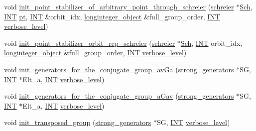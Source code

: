 \begin{DoxyCompactItemize}
void \mbox{\hyperlink{classstrong__generators_a51fbf5e2eeb7ad0c700315ccb4001781}{init\+\_\+point\+\_\+stabilizer\+\_\+of\+\_\+arbitrary\+\_\+point\+\_\+through\+\_\+schreier}} (\mbox{\hyperlink{classschreier}{schreier}} $\ast$\mbox{\hyperlink{simeon_8_c_acbdfb9c3c18b898a9750f161e7255a6c}{Sch}}, \mbox{\hyperlink{galois_8h_a09fddde158a3a20bd2dcadb609de11dc}{I\+NT}} \mbox{\hyperlink{clique__finder_8_c_aec1f1a2b30fdca8844c2932384483145}{pt}}, \mbox{\hyperlink{galois_8h_a09fddde158a3a20bd2dcadb609de11dc}{I\+NT}} \&orbit\+\_\+idx, \mbox{\hyperlink{classlonginteger__object}{longinteger\+\_\+object}} \&full\+\_\+group\+\_\+order, \mbox{\hyperlink{galois_8h_a09fddde158a3a20bd2dcadb609de11dc}{I\+NT}} \mbox{\hyperlink{simeon_8_c_a818073fbcc2f439e7c56952f67386122}{verbose\+\_\+level}})
\item 
void \mbox{\hyperlink{classstrong__generators_abca7016c4618063c8c65a62c4ca889b9}{init\+\_\+point\+\_\+stabilizer\+\_\+orbit\+\_\+rep\+\_\+schreier}} (\mbox{\hyperlink{classschreier}{schreier}} $\ast$\mbox{\hyperlink{simeon_8_c_acbdfb9c3c18b898a9750f161e7255a6c}{Sch}}, \mbox{\hyperlink{galois_8h_a09fddde158a3a20bd2dcadb609de11dc}{I\+NT}} orbit\+\_\+idx, \mbox{\hyperlink{classlonginteger__object}{longinteger\+\_\+object}} \&full\+\_\+group\+\_\+order, \mbox{\hyperlink{galois_8h_a09fddde158a3a20bd2dcadb609de11dc}{I\+NT}} \mbox{\hyperlink{simeon_8_c_a818073fbcc2f439e7c56952f67386122}{verbose\+\_\+level}})
\item 
void \mbox{\hyperlink{classstrong__generators_afc51616fda5a1814d0671585a28cd718}{init\+\_\+generators\+\_\+for\+\_\+the\+\_\+conjugate\+\_\+group\+\_\+av\+Ga}} (\mbox{\hyperlink{classstrong__generators}{strong\+\_\+generators}} $\ast$SG, \mbox{\hyperlink{galois_8h_a09fddde158a3a20bd2dcadb609de11dc}{I\+NT}} $\ast$Elt\+\_\+a, \mbox{\hyperlink{galois_8h_a09fddde158a3a20bd2dcadb609de11dc}{I\+NT}} \mbox{\hyperlink{simeon_8_c_a818073fbcc2f439e7c56952f67386122}{verbose\+\_\+level}})
\item 
void \mbox{\hyperlink{classstrong__generators_af398bc7eb2c325ffd594d339dd1869b4}{init\+\_\+generators\+\_\+for\+\_\+the\+\_\+conjugate\+\_\+group\+\_\+a\+Gav}} (\mbox{\hyperlink{classstrong__generators}{strong\+\_\+generators}} $\ast$SG, \mbox{\hyperlink{galois_8h_a09fddde158a3a20bd2dcadb609de11dc}{I\+NT}} $\ast$Elt\+\_\+a, \mbox{\hyperlink{galois_8h_a09fddde158a3a20bd2dcadb609de11dc}{I\+NT}} \mbox{\hyperlink{simeon_8_c_a818073fbcc2f439e7c56952f67386122}{verbose\+\_\+level}})
\item 
void \mbox{\hyperlink{classstrong__generators_a596b2ad93f3c3f4ea76af81ef8fd831c}{init\+\_\+transposed\+\_\+group}} (\mbox{\hyperlink{classstrong__generators}{strong\+\_\+generators}} $\ast$SG, \mbox{\hyperlink{galois_8h_a09fddde158a3a20bd2dcadb609de11dc}{I\+NT}} \mbox{\hyperlink{simeon_8_c_a818073fbcc2f439e7c56952f67386122}{verbose\+\_\+level}})

\end{DoxyCompactItemize}
